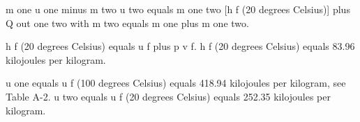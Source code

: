 m one u one minus m two u two equals m one two [h f (20 degrees Celsius)] plus Q out one two  
with m two equals m one plus m one two.  

h f (20 degrees Celsius) equals u f plus p v f.  
h f (20 degrees Celsius) equals 83.96 kilojoules per kilogram.  

u one equals u f (100 degrees Celsius) equals 418.94 kilojoules per kilogram, see Table A-2.  
u two equals u f (20 degrees Celsius) equals 252.35 kilojoules per kilogram.